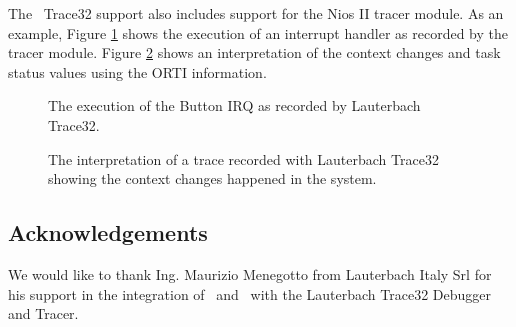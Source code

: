 The \ee\ Trace32 support also includes support for the Nios II tracer
module. As an example, Figure \ref{fig:trace32_chart_irq} shows the
execution of an interrupt handler as recorded by the tracer
module. Figure \ref{fig:trace32_chart_state} shows an interpretation
of the context changes and task status values using the ORTI
information.

%
\begin{figure}
\caption{\label{fig:trace32_chart_irq} The execution of the Button IRQ as recorded by Lauterbach Trace32.}
\end{figure}

%
\begin{figure}
\caption{\label{fig:trace32_chart_state} The interpretation of a trace recorded with Lauterbach Trace32 showing the context changes happened in the system.}
\end{figure}

\subsection{Acknowledgements}

We would like to thank Ing. Maurizio Menegotto from Lauterbach Italy
Srl for his support in the integration of \rtd\ and \ee\ with the
Lauterbach Trace32 Debugger and Tracer.

